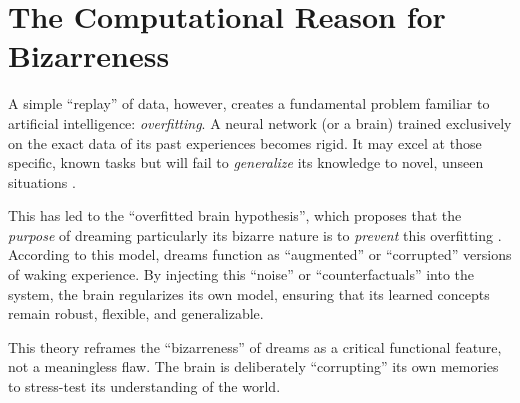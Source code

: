 \section{The Computational Reason for Bizarreness}\label{sec:obh_bizarreness}

A simple ``replay'' of data, however, creates a fundamental problem familiar to artificial intelligence: \textit{overfitting}. A neural network (or a brain) trained exclusively on the exact data of its past experiences becomes rigid. It may excel at those specific, known tasks but will fail to \textit{generalize} its knowledge to novel, unseen situations \citep{hoel2021overfitted}.

This has led to the ``overfitted brain hypothesis'', which proposes that the \textit{purpose} of dreaming \- particularly its bizarre nature \- is to \textit{prevent} this overfitting \citep{hoel2021overfitted}. According to this model, dreams function as ``augmented'' or ``corrupted'' versions of waking experience. By injecting this ``noise'' or ``counterfactuals'' into the system, the brain regularizes its own model, ensuring that its learned concepts remain robust, flexible, and generalizable.

This theory reframes the ``bizarreness'' of dreams as a critical functional feature, not a meaningless flaw. The brain is deliberately ``corrupting'' its own memories to stress-test its understanding of the world.
